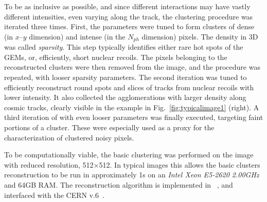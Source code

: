 To be as inclusive as possible, and since different interactions may
have vastly different intensities, even varying along the track, the
clustering procedure was iterated three times.  First, the \dbscan
parameters were tuned to form clusters of dense (in $x$--$y$ dimension)
and intense (in the $N_{ph}$ dimension) pixels. The density in 3D was
called \textit{sparsity}.  This step typically identifies either rare
hot spots of the GEMs, or, efficiently, short nuclear recoils. The
pixels belonging to the reconstructed clusters were then removed from
the image, and the \dbscan procedure was repeated, with looser sparsity
parameters. The second iteration was tuned to efficiently reconstruct
\fe round spots and slices of tracks from nuclear recoils with lower
intensity. It also collected the agglomerations with larger density
along cosmic tracks, clearly visible in the example in
Fig.~\ref{fig:typicalimage1} (right).  A third iteration of \dbscan
with even looser parameters was finally executed, targeting faint
portions of a cluster. These were especially used as a proxy for
the  characterization of clustered noisy pixels.

To be computationally viable, the \idbscan basic clustering was
performed on the image with reduced resolution, 512$\times$512. In
typical images this allows the basic clusters reconstruction to be run
in approximately 1\unit{s} on an \textit{Intel Xeon E5-2620
2.00\unit{GHz}} and 64\unit{GB} RAM. The reconstruction algorithm is
implemented in \PYTHONthree~\cite{python3}, and interfaced with the
CERN \ROOT v.6~\cite{root}.


